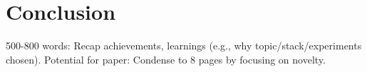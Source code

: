 \section{Conclusion}
\label{sec:conclusion}

500-800 words: Recap achievements, learnings (e.g., why topic/stack/experiments chosen). Potential for paper: Condense to 8 pages by focusing on novelty.